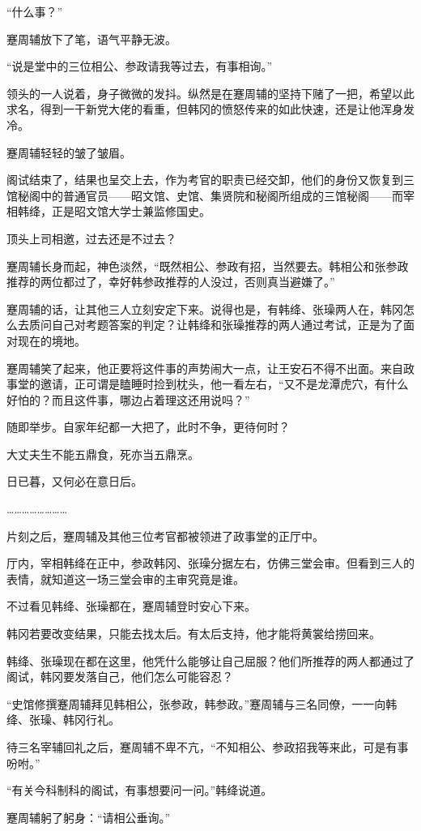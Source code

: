 “什么事？”

蹇周辅放下了笔，语气平静无波。

“说是堂中的三位相公、参政请我等过去，有事相询。”

领头的一人说着，身子微微的发抖。纵然是在蹇周辅的坚持下赌了一把，希望以此求名，得到一干新党大佬的看重，但韩冈的愤怒传来的如此快速，还是让他浑身发冷。

蹇周辅轻轻的皱了皱眉。

阁试结束了，结果也呈交上去，作为考官的职责已经交卸，他们的身份又恢复到三馆秘阁中的普通官员——昭文馆、史馆、集贤院和秘阁所组成的三馆秘阁——而宰相韩绛，正是昭文馆大学士兼监修国史。

顶头上司相邀，过去还是不过去？

蹇周辅长身而起，神色淡然，“既然相公、参政有招，当然要去。韩相公和张参政推荐的两位都过了，幸好韩参政推荐的人没过，否则真当避嫌了。”

蹇周辅的话，让其他三人立刻安定下来。说得也是，有韩绛、张璪两人在，韩冈怎么去质问自己对考题答案的判定？让韩绛和张璪推荐的两人通过考试，正是为了面对现在的境地。

蹇周辅笑了起来，他正要将这件事的声势闹大一点，让王安石不得不出面。来自政事堂的邀请，正可谓是瞌睡时捡到枕头，他一看左右，“又不是龙潭虎穴，有什么好怕的？而且这件事，哪边占着理这还用说吗？”

随即举步。自家年纪都一大把了，此时不争，更待何时？

大丈夫生不能五鼎食，死亦当五鼎烹。

日已暮，又何必在意日后。

……………………

片刻之后，蹇周辅及其他三位考官都被领进了政事堂的正厅中。

厅内，宰相韩绛在正中，参政韩冈、张璪分据左右，仿佛三堂会审。但看到三人的表情，就知道这一场三堂会审的主审究竟是谁。

不过看见韩绛、张璪都在，蹇周辅登时安心下来。

韩冈若要改变结果，只能去找太后。有太后支持，他才能将黄裳给捞回来。

韩绛、张璪现在都在这里，他凭什么能够让自己屈服？他们所推荐的两人都通过了阁试，韩冈要发落自己，他们怎么可能容忍？

“史馆修撰蹇周辅拜见韩相公，张参政，韩参政。”蹇周辅与三名同僚，一一向韩绛、张璪、韩冈行礼。

待三名宰辅回礼之后，蹇周辅不卑不亢，“不知相公、参政招我等来此，可是有事吩咐。”

“有关今科制科的阁试，有事想要问一问。”韩绛说道。

蹇周辅躬了躬身：“请相公垂询。”

